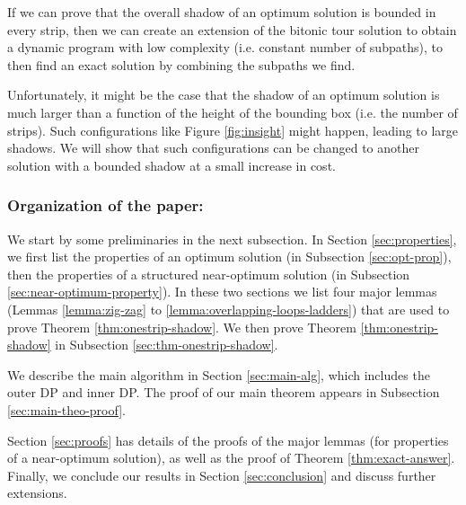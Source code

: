 \documentclass[pdflatex,sn-mathphys-num]{sn-jnl}
\theoremstyle{thmstyleone}
\newcommand{\tw}{\textwidth}
\begin{document}
If we can prove that the overall shadow of an optimum solution is bounded in every strip, then we can create an extension of the bitonic tour solution to obtain a dynamic program with low complexity (i.e. constant number of subpaths), to then find an exact solution by combining the subpaths we find.


Unfortunately, it might be the case that the shadow of an optimum solution is much larger than a function of the height of the bounding box (i.e. the number of strips). Such configurations like Figure \ref{fig:insight} might happen, leading to large shadows. We will show that such configurations can be changed to another solution with a bounded shadow at a small increase in cost.


\subsubsection*{Organization of the paper:} 

We start by some preliminaries in the next subsection. 
In Section \ref{sec:properties}, we first list the properties of an optimum solution (in Subsection \ref{sec:opt-prop}), then the properties of a structured near-optimum solution (in Subsection \ref{sec:near-optimum-property}). In these two sections we list four major lemmas (Lemmas \ref{lemma:zig-zag} to \ref{lemma:overlapping-loops-ladders}) that are used
to prove Theorem \ref{thm:onestrip-shadow}.
We then prove Theorem \ref{thm:onestrip-shadow} in Subsection \ref{sec:thm-onestrip-shadow}. 

We describe the main algorithm in Section \ref{sec:main-alg},
which includes the outer DP and inner DP. The proof of our main theorem appears in Subsection \ref{sec:main-theo-proof}.

Section \ref{sec:proofs} has details of the proofs of the major lemmas (for properties of a near-optimum solution), as well as the proof of Theorem \ref{thm:exact-answer}.
Finally, we conclude our results in Section \ref{sec:conclusion} and discuss further extensions.


\end{document}
